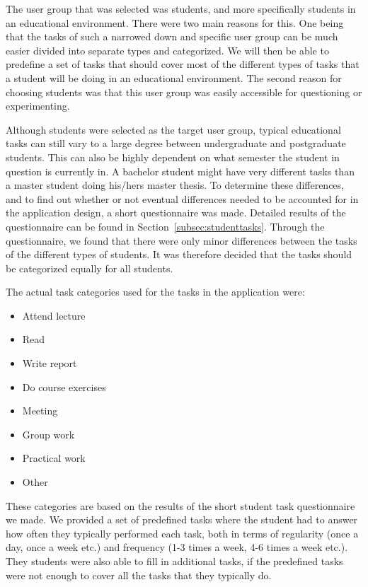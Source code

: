 The user group that was selected was students, and more specifically students in an educational environment. There were two main reasons for this. One being that the tasks of such a narrowed down and specific user group can be much easier divided into separate types and categorized. We will then be able to predefine a set of tasks that should cover most of the different types of tasks that a student will be doing in an educational environment. The second reason for choosing students was that this user group was easily accessible for questioning or experimenting.

Although students were selected as the target user group, typical educational tasks can still vary to a large degree between undergraduate and postgraduate students. This can also be highly dependent on what semester the student in question is currently in. A bachelor student might have very different tasks than a master student doing his/hers master thesis. To determine these differences, and to find out whether or not eventual differences needed to be accounted for in the application design, a short questionnaire was made. Detailed results of the questionnaire can be found in Section~\ref{subsec:studenttasks}. Through the questionnaire, we found that there were only minor differences between the tasks of the different types of students. It was therefore decided that the tasks should be categorized equally for all students.

The actual task categories used for the tasks in the application were:
\begin{itemize}
	\item Attend lecture
	\item Read
	\item Write report
	\item Do course exercises
	\item Meeting
	\item Group work
	\item Practical work
	\item Other
\end{itemize}
These categories are based on the results of the short student task questionnaire we made. We provided a set of predefined tasks where the student had to answer how often they typically performed each task, both in terms of regularity (once a day, once a week etc.) and frequency (1-3 times a week, 4-6 times a week etc.). They students were also able to fill in additional tasks, if the predefined tasks were not enough to cover all the tasks that they typically do.



